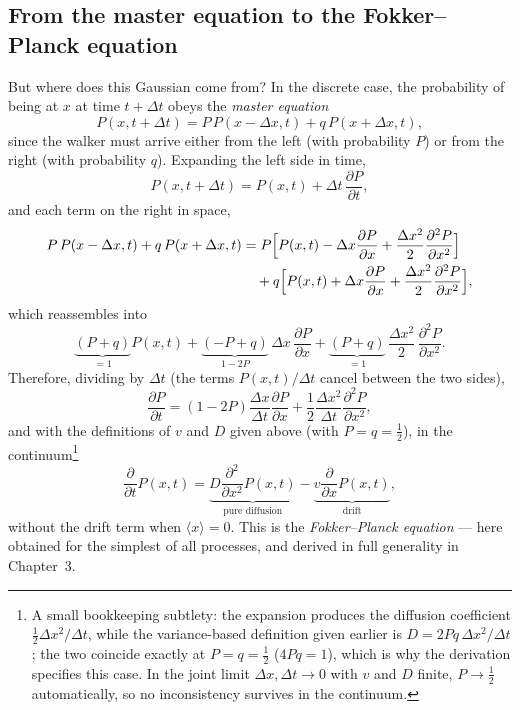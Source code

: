 \subsection{From the master equation to the Fokker--Planck equation}

But where does this Gaussian come from?
In the discrete case, the probability of being at $x$ at time $t+\Delta t$ obeys the \emph{master equation}
\begin{equation}
P(x,t+\Delta t) = P\,P(x-\Delta x,t) + q\,P(x+\Delta x,t),
\end{equation}
since the walker must arrive either from the left (with probability $P$) or from the right (with probability $q$).
Expanding the left side in time,
\begin{equation}
P(x,t+\Delta t) = P(x,t) + \Delta t\,\frac{\partial P}{\partial t},
\end{equation}
and each term on the right in space,
\begin{equation}\begin{split}
P\,P(x-\Delta x,t) + q\,P(x+\Delta x,t)
&= P\Bigl[P(x,t) - \Delta x\frac{\partial P}{\partial x} + \frac{\Delta x^2}{2}\frac{\partial^2 P}{\partial x^2}\Bigr]\\
&\quad + q\Bigl[P(x,t) + \Delta x\frac{\partial P}{\partial x} + \frac{\Delta x^2}{2}\frac{\partial^2 P}{\partial x^2}\Bigr],
\end{split}\end{equation}
which reassembles into
\begin{equation}
\underbrace{(P+q)}_{=1} P(x,t) + \underbrace{(-P+q)}_{1-2P}\,\Delta x\,\frac{\partial P}{\partial x} + \underbrace{(P+q)}_{=1}\,\frac{\Delta x^2}{2}\,\frac{\partial^2 P}{\partial x^2}.
\end{equation}
Therefore, dividing by $\Delta t$ (the terms $P(x,t)/\Delta t$ cancel between the two sides),
\begin{equation}
\frac{\partial P}{\partial t} = (1-2P)\frac{\Delta x}{\Delta t}\frac{\partial P}{\partial x} + \frac{1}{2}\frac{\Delta x^2}{\Delta t}\frac{\partial^2 P}{\partial x^2},
\end{equation}
and with the definitions of $v$ and $D$ given above (with $P=q=\tfrac12$), in the continuum\footnote{A small bookkeeping subtlety: the expansion produces the diffusion coefficient $\tfrac12\Delta x^2/\Delta t$, while the variance-based definition given earlier is $D = 2Pq\,\Delta x^2/\Delta t$; the two coincide exactly at $P=q=\tfrac12$ ($4Pq=1$), which is why the derivation specifies this case.
In the joint limit $\Delta x,\Delta t\to0$ with $v$ and $D$ finite, $P\to\tfrac12$ automatically, so no inconsistency survives in the continuum.}
\begin{equation}
\frac{\partial}{\partial t}P(x,t) = \underbrace{D\frac{\partial^2}{\partial x^2}P(x,t)}_{\text{pure diffusion}} - \underbrace{v\frac{\partial}{\partial x}P(x,t)}_{\text{drift}},
\end{equation}
without the drift term when $\langle x\rangle=0$.
This is the \emph{Fokker--Planck equation} --- here obtained for the simplest of all processes, and derived in full generality in Chapter~3.


